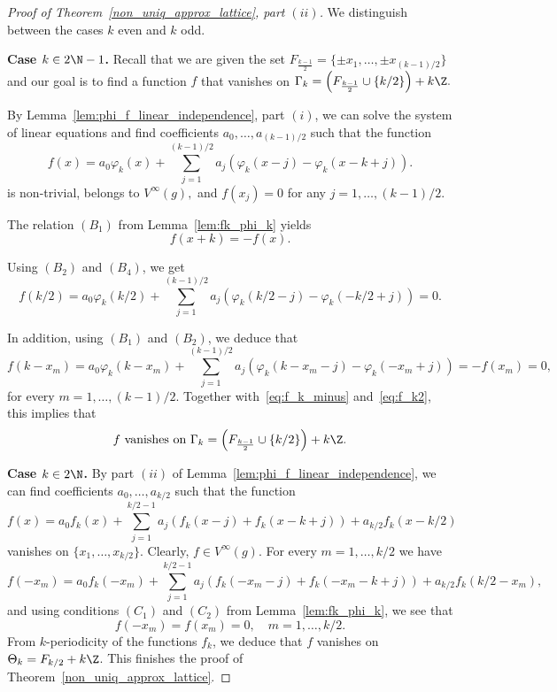 \documentclass[12pt]{amsart}
\numberwithin{equation}{section}
\begin{document}
\begin{proof}[Proof of Theorem~\ref{non_uniq_approx_lattice}, part $(ii)$] We distinguish between the cases $k$ even and $k$ odd.

{\bf Case $k\in 2 \N-1$.}
Recall that we are given the set $F_{\frac{k-1}{2}} = \{\pm x_1, \dots, \pm x_{(k-1)/2}\}$ and our goal is to find a function $f$ that vanishes on $\Gamma_k=\left(F_{\frac{k-1}{2}} \cup  \{k/2\}\right) + k \Z.$ 

By Lemma~\ref{lem:phi_f_linear_independence}, part $(i)$, we can solve the system of linear equations and find coefficients $a_0, \dots, a_{(k-1)/2}$ such that the function
\begin{equation*}
    f(x) = a_0\varphi_k(x) + \sum\limits_{j=1}^{(k-1)/2} a_{j} \left( \varphi_k(x-j) - \varphi_k(x-k+j) \right).
\end{equation*}
is non-trivial, belongs to $V^{\infty}(g),$ and  $f(x_j) = 0$ for any $j=1, \dots,{(k-1)/2}.$ 

The relation $(B_1)$ from Lemma~\ref{lem:fk_phi_k} yields 
\begin{equation}\label{eq:f_k_minus}
f(x+k) = - f(x).    
\end{equation}

Using $(B_2)$ and $(B_4)$, we get
\begin{equation}\label{eq:f_k2}
    f(k/2) =  a_0 \varphi_k(k/2) + \sum\limits_{j=1}^{(k-1)/2} a_{j} \left( \varphi_k(k/2-j) - \varphi_k(-k/2+j) \right) = 0.
\end{equation}

In addition, using $(B_1)$ and $(B_2)$, we deduce that 
$$
f(k-x_m) = a_0\varphi_k(k-x_m) + \sum\limits_{j=1}^{(k-1)/2} a_{j} \left( \varphi_k(k-x_m-j) - \varphi_k(-x_m+j) \right)=-f(x_m)=0,
$$
for every $m=1,\dots,(k-1)/2$.
Together with~\eqref{eq:f_k_minus} and~\eqref{eq:f_k2}, this implies that $$f \,\, \text{vanishes on } \Gamma_k=\left(F_{\frac{k-1}{2}} \cup \{k/2\}\right) + k \Z. $$

{\bf Case $k\in 2 \N$.}
By part $(ii)$ of Lemma~\ref{lem:phi_f_linear_independence},  we can find coefficients $a_0, \dots, a_{k/2}$ such that the function
\begin{equation}
    f(x) = a_0 f_k(x) + \sum\limits_{j=1}^{k/2-1} a_{j} \left( f_k(x-j) + f_k(x-k+j) \right)+ a_{k/2}f_k(x-k/2)
\end{equation}
vanishes on $\{x_1, \dots, x_{k/2}\}.$ Clearly, $f\in V^{\infty}(g).$
For every $m=1,\dots,k/2$ we have
$$
f(-x_m)= a_0 f_k(-x_m) + \sum\limits_{j=1}^{k/2-1}  a_{j} \left( f_k(-x_m-j) + f_k(-x_m-k+j) \right)+ a_{k/2}f_k(k/2-x_m),
$$
and using conditions $(C_1)$ and $(C_2)$ from Lemma~\ref{lem:fk_phi_k}, we see that $$f(-x_m)=f(x_m)=0, \quad m=1,\dots,k/2.$$ From $k$-periodicity of the functions $f_k$, we deduce that $f$ vanishes on $\Theta_k=F_{k/2}+k\Z$.
This finishes the proof of Theorem~\ref{non_uniq_approx_lattice}.


 \end{proof}
\end{document}
